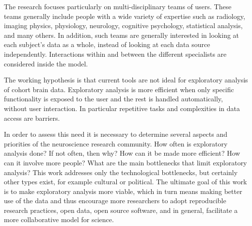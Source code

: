 The research focuses particularly on multi-disciplinary teams of users. These teams generally include people with a wide variety of expertise such as radiology, imaging physics, physiology, neurology, cognitive psychology, statistical analysis, and many others. In addition, such teams are generally interested in looking at each subject's data as a whole, instead of looking at each data source independently. Interactions within and between the different specialists are considered inside the model. 

The working hypothesis is that  current tools are not ideal for exploratory analysis of cohort brain data. Exploratory analysis is more efficient when only specific functionality is exposed to the user and the rest is handled automatically, without user interaction. In particular repetitive tasks and complexities in data access are barriers. 

In order to assess this need it is necessary to determine several aspects and priorities of the neuroscience research community. How often is exploratory analysis done? If not often, then why? How can it be made more efficient? How can it involve more people? What are the main bottlenecks that limit exploratory analysis? This work addresses only the technological bottlenecks, but certainly other types exist, for example cultural or political. The ultimate goal of this work is to make exploratory analysis more viable, which in turn means making better use of the data and thus encourage more researchers to adopt reproducible research practices, open data, open source software, and in general, facilitate a more collaborative model for science.









